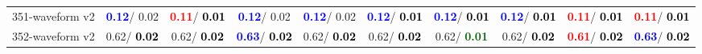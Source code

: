 \begin{table}[h]
\begin{center}
{\begin{tabular}{lc|c|c|c|c|c|c|c|c}
351-waveform v2 & \textcolor{blue}{\textbf{  0.12}}/  0.02 & \textcolor{red}{\textbf{  0.11}}/\textcolor{black}{\textbf{  0.01}} & \textcolor{blue}{\textbf{  0.12}}/  0.02 & \textcolor{blue}{\textbf{  0.12}}/  0.02 & \textcolor{blue}{\textbf{  0.12}}/\textcolor{black}{\textbf{  0.01}} & \textcolor{blue}{\textbf{  0.12}}/\textcolor{black}{\textbf{  0.01}} & \textcolor{blue}{\textbf{  0.12}}/\textcolor{black}{\textbf{  0.01}} & \textcolor{red}{\textbf{  0.11}}/\textcolor{black}{\textbf{  0.01}} & \textcolor{red}{\textbf{  0.11}}/\textcolor{black}{\textbf{  0.01}} \\
352-waveform v2 &   0.62/\textcolor{black}{\textbf{  0.02}} &   0.62/\textcolor{black}{\textbf{  0.02}} & \textcolor{blue}{\textbf{  0.63}}/\textcolor{black}{\textbf{  0.02}} &   0.62/\textcolor{black}{\textbf{  0.02}} &   0.62/\textcolor{black}{\textbf{  0.02}} &   0.62/\textcolor{darkgreen}{\textbf{  0.01}} &   0.62/\textcolor{black}{\textbf{  0.02}} & \textcolor{red}{\textbf{  0.61}}/\textcolor{black}{\textbf{  0.02}} & \textcolor{blue}{\textbf{  0.63}}/\textcolor{black}{\textbf{  0.02}} \\\end{tabular}}\label{stratsALCKappa10AllReduxalla}
\end{center}
\end{table}
